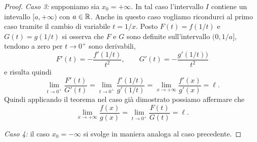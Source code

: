 \begin{proof}
\emph{Caso 3:} supponiamo sia $x_0=+\infty$. In tal caso
l'intervallo $I$ contiene un intevallo $[a,+\infty)$ con $a\in{\mathbb R}$.
Anche in questo caso vogliamo ricondurci al primo caso tramite il cambio
di variabile $t=1/x$. Posto $F(t) = f(1/t)$ e $G(t)= g(1/t)$ si osserva che $F$ e $G$
sono definite sull'intervallo $(0,1/a]$,
tendono a zero per $t\to 0^+$
sono derivabili,
\[
  F'(t) = -\frac{f'(1/t)}{t^2}, \qquad
  G'(t) = -\frac{g'(1/t))}{t^2}
\]
e risulta quindi
\[
  \lim_{t\to 0^+} \frac{F'(t)}{G'(t)}
  = \lim_{t\to 0^+} \frac{f'(1/t)}{g'(1/t)}
  = \lim_{x\to +\infty} \frac{f'(x)}{g'(x)} = \ell.
\]
Quindi applicando il teorema nel caso già dimostrato possiamo affermare che
\[
  \lim_{x\to +\infty} \frac{f(x)}{g(x)} = \lim_{t\to 0^+} \frac{F(t)}{G(t)} = \ell.
\]

\emph{Caso 4:} il caso $x_0 = -\infty$ si svolge in maniera analoga al caso precedente.
\end{proof}

